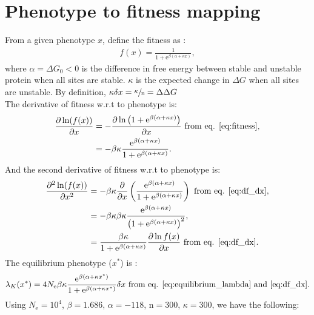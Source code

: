 \documentclass{article}
\newcommand{\e}{\mathrm{e}}
\newcommand{\Ne}{N_{\mathrm{e}}}
\newcommand{\Nsite}{\text{n}}
\newcommand{\x}{x}
\newcommand{\eq}{^{*}}
\newcommand{\dx}{\delta \x}
\begin{document}
\section*{Phenotype to fitness mapping}
From a given phenotype $\x$, define the fitness as :
\begin{gather}
 f(\x) = \frac{1}{1 + \e^{\beta(\alpha + \kappa \x)}}, \label{eq:fitness}
\end{gather}
where $\alpha = \Delta G_0 < 0$ is the difference in free energy between stable and unstable protein when all sites are stable. $\kappa$ is the expected change in $\Delta G$ when all sites are unstable. By definition, $\kappa \dx = \sfrac{\kappa}{\Nsite} = \Delta \Delta G $\\
The derivative of fitness w.r.t to phenotype is:
\begin{align}
 \frac{\partial \ln (f(\x))}{\partial \x}  & = - \frac{\partial \ln \left( 1 + \e^{\beta(\alpha + \kappa \x)} \right)}{\partial \x} \text{ from eq. \ref{eq:fitness}}, \\
 & = - \beta \kappa \frac{\e^{\beta(\alpha + \kappa \x)}}{1 + \e^{\beta(\alpha + \kappa \x)}} \label{eq:df_dx}.
\end{align}
And the second derivative of fitness w.r.t to phenotype is:
\begin{align}
\frac{\partial^2 \ln (f(\x))}{\partial {\x}^2} & = - \beta \kappa \frac{\partial}{\partial \x} \left( \frac{\e^{\beta(\alpha + \kappa \x)}}{1 + \e^{\beta(\alpha + \kappa \x)}} \right) \text{ from eq. \ref{eq:df_dx}}, \\
 & = - \beta \kappa  \beta \kappa \frac{\e^{\beta(\alpha + \kappa \x)}}{\left( 1 + \e^{\beta(\alpha + \kappa \x)}\right)^2}, \\
 & = \frac{\beta \kappa}{1 + \e^{\beta(\alpha + \kappa \x)}} \frac{ \partial \ln f(\x) }{\partial {\x}} \text{ from eq. \ref{eq:df_dx}} \label{eq:df2_dx2}.
\end{align}
The equilibrium phenotype ($\x\eq$) is :
\begin{gather}
\lambda_{K}(\x\eq) = 4\Ne \beta \kappa \frac{\e^{\beta(\alpha + \kappa \x\eq)}}{1 + \e^{\beta(\alpha + \kappa \x\eq)}}  \dx   \text{ from eq. \ref{eq:equilibrium_lambda} and \ref{eq:df_dx}}.
\end{gather}
Using $\Ne=10^4$, $\beta=1.686$, $\alpha = -118$, $\Nsite=300$, $\kappa=300$, we have the following:
\end{document}
